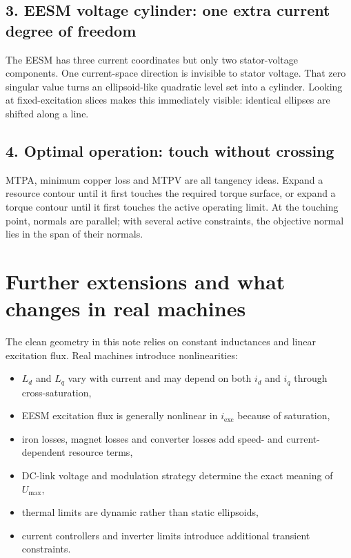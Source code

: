 \documentclass[11pt,a4paper]{article}
\begin{document}
\subsection*{3. EESM voltage cylinder: one extra current degree of freedom}
The EESM has three current coordinates but only two stator-voltage components. One current-space direction is invisible to stator voltage. That zero singular value turns an ellipsoid-like quadratic level set into a cylinder. Looking at fixed-excitation slices makes this immediately visible: identical ellipses are shifted along a line.

\subsection*{4. Optimal operation: touch without crossing}
MTPA, minimum copper loss and MTPV are all tangency ideas. Expand a resource contour until it first touches the required torque surface, or expand a torque contour until it first touches the active operating limit. At the touching point, normals are parallel; with several active constraints, the objective normal lies in the span of their normals.

\section{Further extensions and what changes in real machines}

The clean geometry in this note relies on constant inductances and linear excitation flux. Real machines introduce nonlinearities:

\begin{itemize}
  \item $L_d$ and $L_q$ vary with current and may depend on both $i_d$ and $i_q$ through cross-saturation,
  \item EESM excitation flux is generally nonlinear in $i_{\mathrm{exc}}$ because of saturation,
  \item iron losses, magnet losses and converter losses add speed- and current-dependent resource terms,
  \item DC-link voltage and modulation strategy determine the exact meaning of $U_{\max}$,
  \item thermal limits are dynamic rather than static ellipsoids,
  \item current controllers and inverter limits introduce additional transient constraints.
\end{itemize}
\end{document}
